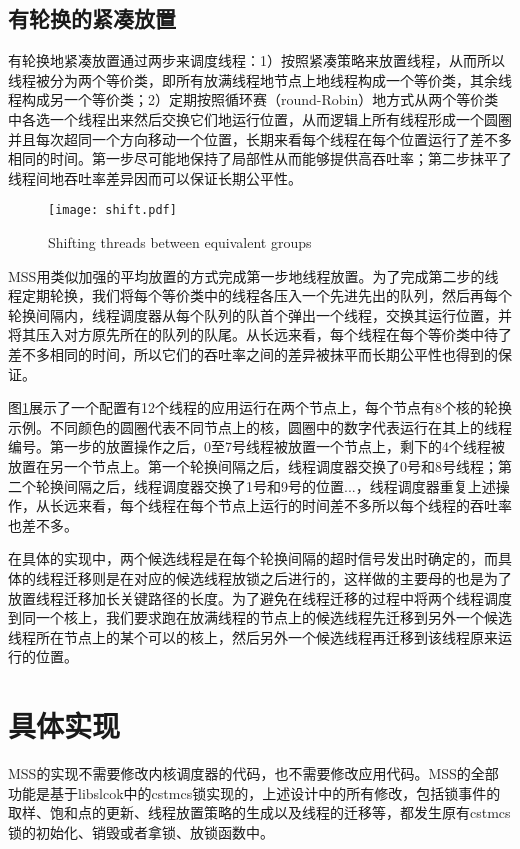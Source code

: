 \subsection{有轮换的紧凑放置}
有轮换地紧凑放置通过两步来调度线程：1）按照紧凑策略来放置线程，从而所以线程被分为两个等价类，即所有放满线程地节点上地线程构成一个等价类，其余线程构成另一个等价类；2）定期按照循环赛（round-Robin）地方式从两个等价类中各选一个线程出来然后交换它们地运行位置，从而逻辑上所有线程形成一个圆圈并且每次超同一个方向移动一个位置，长期来看每个线程在每个位置运行了差不多相同的时间。第一步尽可能地保持了局部性从而能够提供高吞吐率；第二步抹平了线程间地吞吐率差异因而可以保证长期公平性。
\begin{figure}[t]
	\centering
	\texttt{[image: shift.pdf]}
	\caption{Shifting threads between equivalent groups}
	\label{Fig:shift}
\end{figure}

MSS用类似加强的平均放置的方式完成第一步地线程放置。为了完成第二步的线程定期轮换，我们将每个等价类中的线程各压入一个先进先出的队列，然后再每个轮换间隔内，线程调度器从每个队列的队首个弹出一个线程，交换其运行位置，并将其压入对方原先所在的队列的队尾。从长远来看，每个线程在每个等价类中待了差不多相同的时间，所以它们的吞吐率之间的差异被抹平而长期公平性也得到的保证。

图\ref{Fig:shift}展示了一个配置有12个线程的应用运行在两个节点上，每个节点有8个核的轮换示例。不同颜色的圆圈代表不同节点上的核，圆圈中的数字代表运行在其上的线程编号。第一步的放置操作之后，0至7号线程被放置一个节点上，剩下的4个线程被放置在另一个节点上。第一个轮换间隔之后，线程调度器交换了0号和8号线程；第二个轮换间隔之后，线程调度器交换了1号和9号的位置...，线程调度器重复上述操作，从长远来看，每个线程在每个节点上运行的时间差不多所以每个线程的吞吐率也差不多。

在具体的实现中，两个候选线程是在每个轮换间隔的超时信号发出时确定的，而具体的线程迁移则是在对应的候选线程放锁之后进行的，这样做的主要母的也是为了放置线程迁移加长关键路径的长度。为了避免在线程迁移的过程中将两个线程调度到同一个核上，我们要求跑在放满线程的节点上的候选线程先迁移到另外一个候选线程所在节点上的某个可以的核上，然后另外一个候选线程再迁移到该线程原来运行的位置。

\section{具体实现}
MSS的实现不需要修改内核调度器的代码，也不需要修改应用代码。MSS的全部功能是基于libslcok\cite{kashyap2017scalable}中的cstmcs锁实现的，上述设计中的所有修改，包括锁事件的取样、饱和点的更新、线程放置策略的生成以及线程的迁移等，都发生原有cstmcs锁的初始化、销毁或者拿锁、放锁函数中。

